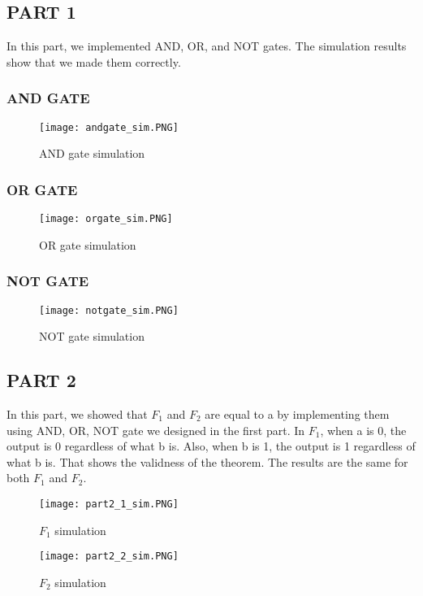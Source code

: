 \documentclass[pdftex,12pt,a4paper]{article}
\begin{document}
\subsection{PART 1}
In this part, we implemented AND, OR, and NOT gates. The simulation results show that we made them correctly.

\subsubsection{AND GATE}

\begin{figure}[ht]
	\centering
	\texttt{[image: andgate\_sim.PNG]}	
	\caption{AND gate simulation}
	\label{fig14}
\end{figure}

\subsubsection{OR GATE}

\begin{figure}[ht]
	\centering
	\texttt{[image: orgate\_sim.PNG]}	
	\caption{OR gate simulation}
	\label{fig17}
\end{figure}
\subsubsection{NOT GATE}
\begin{figure}[ht]
	\centering
	\texttt{[image: notgate\_sim.PNG]}	
	\caption{NOT gate simulation}
	\label{fig18}
\end{figure}

\clearpage
\subsection{PART 2}
In this part, we showed that \(F_1\) and \(F_2\) are equal to a by implementing them using AND, OR, NOT gate we designed in the first part. In  \(F_1\), when a is 0, the output is 0 regardless of what b is. Also, when b is 1, the output is 1 regardless of what b is. That shows the validness of the theorem. The results are the same for both \(F_1\) and \(F_2\).

\begin{figure}[ht]
	\centering
	\texttt{[image: part2\_1\_sim.PNG]}	
	\caption{\(F_1\) simulation}
	\label{fig12}
\end{figure}
\begin{figure}[ht]
	\centering
	\texttt{[image: part2\_2\_sim.PNG]}	
	\caption{\(F_2\) simulation}
	\label{fig13}
\end{figure}
\clearpage
\end{document}
